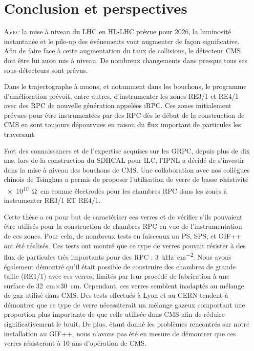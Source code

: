 \chapter{Conclusion et perspectives}
\renewcommand\chapterillustration{CON/CON}
\ThisULCornerWallPaper{1}{\chapterillustration}
\vspace*{-0.5cm}
\lettrine[lines=4, slope=-0.5em,nindent=10pt]{A}{vec} la mise à niveau du LHC en HL-LHC prévue pour \num{2026}, la luminosité instantanée et le pile-up des événements vont augmenter de façon significative. Afin de faire face à cette augmentation du taux de collisions, le détecteur CMS doit être lui aussi mis à niveau. De nombreux changements dans presque tous ses sous-détecteurs sont prévus.

Dans le trajectographe à muons, et notamment dans les bouchons, le programme d'amélioration prévoit, entre autres, d'instrumenter les zones RE3/1 et RE4/1 avec des RPC de nouvelle génération appelées iRPC. Ces zones initialement prévues pour être instrumentées par des RPC dès le début de la construction de CMS en sont toujours dépourvues en raison du flux important de particules les traversant.

Fort des connaissances et de l'expertise acquises sur les GRPC, depuis plus de dix ans, lors de la construction du SDHCAL pour ILC, l'IPNL a décidé de s'investir dans la mise à niveau des bouchons de CMS. Une collaboration avec nos collègues chinois de Tsinghua a permis de proposer l'utilisation de verre de basse résistivité \SI{e10}{\ohm\centi\meter} comme électrodes pour les chambres RPC dans les zones à instrumenter RE3/1 ET RE4/1. 

Cette thèse a eu pour but de caractériser ces verres et de vérifier s'ils pouvaient être utilisés pour la construction de chambres RPC en vue de l'instrumentation de ces zones. Pour cela, de nombreux tests en faisceaux au PS, SPS, et GIF++ ont été réalisés. Ces tests ont montré que ce type de verres pouvait résister à des flux de particules très importants pour des RPC : \SI{3}{\kilo\hertz\per\square\centi\meter}. Nous avons également démontré qu'il était possible de construire des chambres de grande taille (RE1/1) avec ces verres, limités par leur procédé de fabrication à une surface de \SI{32}{\centi\meter}$\times$\SI{30}{\centi\meter}. Cependant, ces verres semblent inadaptés au mélange de gaz utilisé dans CMS. Des tests effectués à Lyon et au CERN tendent à démontrer que ce type de verre nécessiterait un mélange gazeux comportant une proportion plus importante de  que celle utilisée dans CMS afin de réduire significativement le bruit. De plus, étant donné les problèmes rencontrés sur notre installation au GIF++, nous n'avons pas été en mesure de démontrer que ces verres résisteront à \num{10} ans d'opération de CMS.

